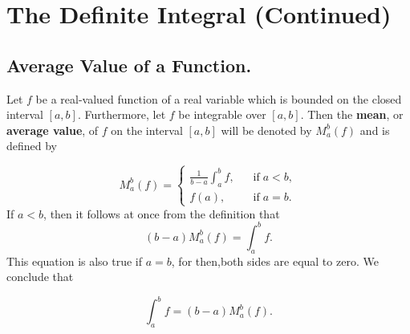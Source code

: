 \chapter{The Definite Integral (Continued)} \label{chp 8}
\section{Average Value of a Function.}\label{sec 8.1} 
Let $f$ be a real-valued function of a real variable which is bounded on the closed interval $[a, b]$. Furthermore, let $f$ be integrable over $[a, b]$. Then the \textbf{mean}, or \textbf{average value}, of $f$ on the interval $[a, b]$ will be denoted by $M_a^b(f)$ and is defined by

$$
M_a^b(f) = \left\{ \begin{array}{ll}
                                \frac{1}{b - a} \int_a^b f, &\;\;\; \mbox{if}\; a < b,\\
                                f(a),                                &\;\;\; \mbox{if}\; a = b.
      \end{array}
                                \right .
$$
\noindent If $a < b$, then it follows at once from the definition that
$$
(b - a)M_a^b(f) = \int_a^b f .
$$
\noindent This equation is also true if $a = b$, for then,both sides are equal to zero. We conclude that

\begin{theorem} %
$$
\int_a^b f = (b - a)M_a^b(f). 
$$
\end{theorem}

